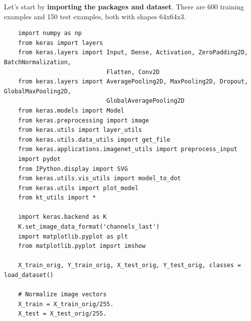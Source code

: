 \documentclass[11pt, a4paper]{article}
\begin{document}
\begin{spacing}{1.1}
	\noindent Let's start by \textbf{importing the packages and dataset}. There are 600 training examples and 150 test examples, both with shapes 64x64x3. 
	\begin{lstlisting}
	import numpy as np
	from keras import layers
	from keras.layers import Input, Dense, Activation, ZeroPadding2D, BatchNormalization, 
	                         Flatten, Conv2D
	from keras.layers import AveragePooling2D, MaxPooling2D, Dropout, GlobalMaxPooling2D, 
	                         GlobalAveragePooling2D
	from keras.models import Model
	from keras.preprocessing import image
	from keras.utils import layer_utils
	from keras.utils.data_utils import get_file
	from keras.applications.imagenet_utils import preprocess_input
	import pydot
	from IPython.display import SVG
	from keras.utils.vis_utils import model_to_dot
	from keras.utils import plot_model
	from kt_utils import *
	
	import keras.backend as K
	K.set_image_data_format('channels_last')
	import matplotlib.pyplot as plt
	from matplotlib.pyplot import imshow
	
	X_train_orig, Y_train_orig, X_test_orig, Y_test_orig, classes = load_dataset()
	
	# Normalize image vectors
	X_train = X_train_orig/255.
	X_test = X_test_orig/255.
	

\end{lstlisting}
\end{spacing}
\end{document}
